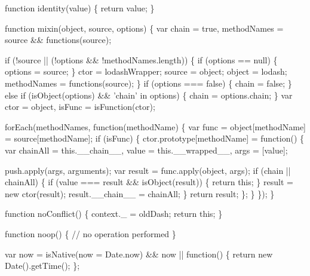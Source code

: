 \begin{DoxyCodeInclude}
    \textcolor{keyword}{function} identity(value) \{
      \textcolor{keywordflow}{return} value;
    \}

    \textcolor{keyword}{function} mixin(\textcolor{keywordtype}{object}, source, options) \{
      var chain = \textcolor{keyword}{true},
          methodNames = source && functions(source);

      \textcolor{keywordflow}{if} (!source || (!options && !methodNames.length)) \{
        \textcolor{keywordflow}{if} (options == null) \{
          options = source;
        \}
        ctor = lodashWrapper;
        source = object;
        \textcolor{keywordtype}{object} = lodash;
        methodNames = functions(source);
      \}
      \textcolor{keywordflow}{if} (options === \textcolor{keyword}{false}) \{
        chain = \textcolor{keyword}{false};
      \} \textcolor{keywordflow}{else} \textcolor{keywordflow}{if} (isObject(options) && \textcolor{stringliteral}{'chain'} in options) \{
        chain = options.chain;
      \}
      var ctor = object,
          isFunc = isFunction(ctor);

      forEach(methodNames, \textcolor{keyword}{function}(methodName) \{
        var func = \textcolor{keywordtype}{object}[methodName] = source[methodName];
        \textcolor{keywordflow}{if} (isFunc) \{
          ctor.prototype[methodName] = \textcolor{keyword}{function}() \{
            var chainAll = this.\_\_chain\_\_,
                value = this.\_\_wrapped\_\_,
                args = [value];

            push.apply(args, arguments);
            var result = func.apply(\textcolor{keywordtype}{object}, args);
            \textcolor{keywordflow}{if} (chain || chainAll) \{
              \textcolor{keywordflow}{if} (value === result && isObject(result)) \{
                \textcolor{keywordflow}{return} \textcolor{keyword}{this};
              \}
              result = \textcolor{keyword}{new} ctor(result);
              result.\_\_chain\_\_ = chainAll;
            \}
            \textcolor{keywordflow}{return} result;
          \};
        \}
      \});
    \}

    \textcolor{keyword}{function} noConflict() \{
      context.\_ = oldDash;
      \textcolor{keywordflow}{return} \textcolor{keyword}{this};
    \}

    \textcolor{keyword}{function} noop() \{
      \textcolor{comment}{// no operation performed}
    \}

    var now = isNative(now = Date.now) && now || \textcolor{keyword}{function}() \{
      \textcolor{keywordflow}{return} \textcolor{keyword}{new} Date().getTime();
    \};


\end{DoxyCodeInclude}
